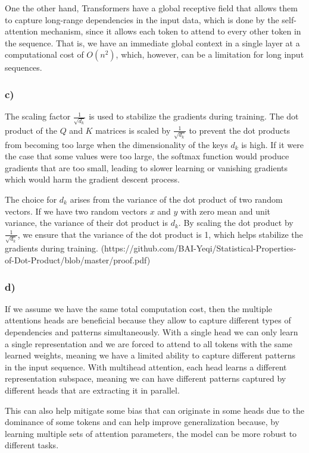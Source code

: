 \documentclass{article}
\begin{document}
One the other hand, Transformers have a global
receptive field that allows them to capture long-range dependencies in the input data, which is done by the self-attention
mechanism, since it allows each token to attend to every other token in the sequence. That is, we have an immediate
global context in a single layer at a computational cost of $O(n^2)$, which, however, can be a limitation for long input sequences.

\subsubsection*{c)}

The scaling factor $\frac{1}{\sqrt{d_k}}$ is used to stabilize the gradients during training. The dot product of the
$Q$ and $K$ matrices is scaled by $\frac{1}{\sqrt{d_k}}$ to prevent the dot products from becoming too large when the
dimensionality of the keys $d_k$ is high. If it were the case that some values were too large, the softmax function would
produce gradients that are too small, leading to slower learning or vanishing gradients which would harm the gradient descent process.

The choice for $d_k$ arises from the variance of the dot product of two random vectors. If we have two random vectors $x$ and $y$
with zero mean and unit variance, the variance of their dot product is $d_k$. By scaling the dot product by $\frac{1}{\sqrt{d_k}}$,
we ensure that the variance of the dot product is 1, which helps stabilize the gradients during training.
(https://github.com/BAI-Yeqi/Statistical-Properties-of-Dot-Product/blob/master/proof.pdf)

\subsubsection*{d)}

If we assume we have the same total computation cost, then the multiple attentions heads are beneficial because they allow
to capture different types of dependencies and patterns simultaneously.
With a single head we can only learn a single representation and we are forced to attend to all tokens with the same
learned weights, meaning we have a limited ability to capture different patterns in the input sequence.
With multihead attention, each head learns a different representation subspace, meaning we can have different patterns
captured by different heads that are extracting it in parallel. 

This can also help mitigate some bias that can originate in some
heads due to the dominance of some tokens and can help improve generalization because, by learning multiple sets of
attention parameters, the model can be more robust to different tasks.
\end{document}
